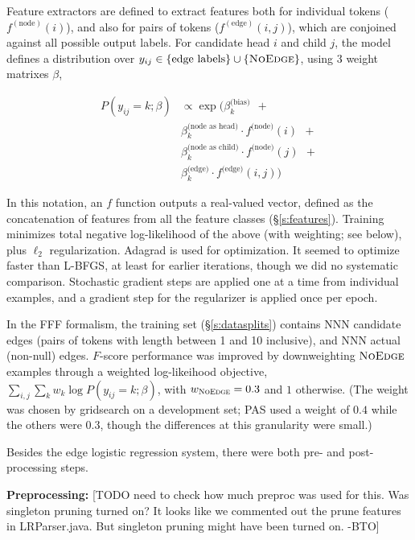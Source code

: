 \documentclass[11pt]{article}
\newcommand{\bocomment}[1]{\textcolor{Bittersweet}{[#1 -BTO]}}
\begin{document}
Feature extractors are defined to extract features both for individual tokens ($f^{(\text{node})}(i)$), and also for pairs of tokens ($f^{(\text{edge})}(i,j)$), which are conjoined against all possible output labels.
For candidate head $i$ and child $j$, the model defines a distribution over
$y_{ij} \in \{\text{edge labels}\} \cup \{\textsc{NoEdge}\}$, using $3$ weight matrixes $\beta$,

\begin{align*} 
  P(y_{ij}=k; \beta) & \propto 
  \exp \big( \beta^{\text{(bias)}}_k \ \ + \\
  &
  \beta^{\text{(node as head)}}_k \cdot f^{\text{(node)}}(i)
  \ \ + \\ 
  &
  \beta^{\text{(node as child)}}_k \cdot f^{\text{(node)}}(j)
  \ \ + \\
  &
  \beta^{\text{(edge)}}_k \cdot f^{\text{(edge)}}(i,j)
    \big)
\end{align*}

\noindent
In this notation, an $f$ function outputs a real-valued vector, defined as the concatenation of features from all the feature classes (\S\ref{s:features}).
Training minimizes total negative log-likelihood of the above (with weighting; see below),
plus $\ell_2$ regularization.  Adagrad \cite{duchi2011adaptive} is used for optimization.
It seemed to optimize faster than L-BFGS, at least for earlier iterations, though we did no systematic comparison. Stochastic gradient steps are applied one at a time from individual examples, and a gradient step for the regularizer is applied once per epoch.

In the FFF formalism, the training set (\S\ref{s:datasplits})
contains NNN candidate edges (pairs of tokens with length between 1 and 10 inclusive),
and NNN actual (non-null) edges.  $F$-score performance was improved by downweighting $\textsc{NoEdge}$ examples through a weighted log-likeihood objective,
$\sum_{i,j} \sum_k w_k \log P(y_{ij}=k;\beta)$,
with $w_{\textsc{NoEdge}}=0.3$ and $1$ otherwise.  
(The weight was chosen by gridsearch on a development set; 
PAS used a weight of $0.4$ while the others were $0.3$, though the differences at this granularity were small.)

Besides the edge logistic regression system, there were both pre- and post-processing steps.

\textbf{Preprocessing:}
\bocomment{TODO need to check how much preproc was used for this.  Was singleton pruning turned on?  It looks like we commented out the prune features in LRParser.java.  But singleton pruning might have been turned on.}
\end{document}
